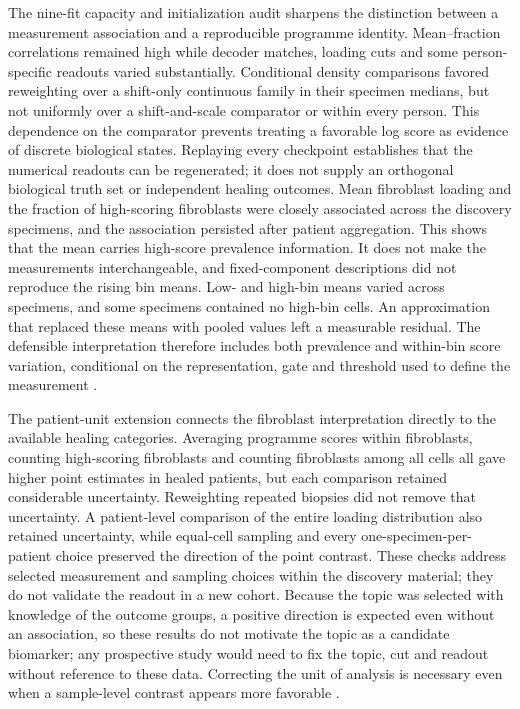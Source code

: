 \documentclass[10pt,a4paper]{article}
\begin{document}
The nine-fit capacity and initialization audit sharpens the distinction between a measurement association and a reproducible programme identity. Mean--fraction correlations remained high while decoder matches, loading cuts and some person-specific readouts varied substantially. Conditional density comparisons favored reweighting over a shift-only continuous family in their specimen medians, but not uniformly over a shift-and-scale comparator or within every person. This dependence on the comparator prevents treating a favorable log score as evidence of discrete biological states. Replaying every checkpoint establishes that the numerical readouts can be regenerated; it does not supply an orthogonal biological truth set or independent healing outcomes.
Mean fibroblast loading and the fraction of high-scoring fibroblasts were closely associated across the discovery specimens, and the association persisted after patient aggregation. This shows that the mean carries high-score prevalence information. It does not make the measurements interchangeable, and fixed-component descriptions did not reproduce the rising bin means. Low- and high-bin means varied across specimens, and some specimens contained no high-bin cells. An approximation that replaced these means with pooled values left a measurable residual. The defensible interpretation therefore includes both prevalence and within-bin score variation, conditional on the representation, gate and threshold used to define the measurement \citep{altman2006,buettner2021}.

The patient-unit extension connects the fibroblast interpretation directly to the available healing categories. Averaging programme scores within fibroblasts, counting high-scoring fibroblasts and counting fibroblasts among all cells all gave higher point estimates in healed patients, but each comparison retained considerable uncertainty. Reweighting repeated biopsies did not remove that uncertainty. A patient-level comparison of the entire loading distribution also retained uncertainty, while equal-cell sampling and every one-specimen-per-patient choice preserved the direction of the point contrast. These checks address selected measurement and sampling choices within the discovery material; they do not validate the readout in a new cohort. Because the topic was selected with knowledge of the outcome groups, a positive direction is expected even without an association, so these results do not motivate the topic as a candidate biomarker; any prospective study would need to fix the topic, cut and readout without reference to these data. Correcting the unit of analysis is necessary even when a sample-level contrast appears more favorable \citep{squair2021,zimmerman2021}.
\end{document}
